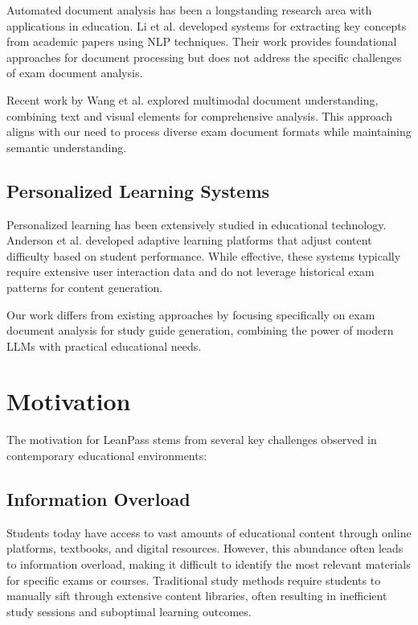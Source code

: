 \documentclass[conference]{IEEEtran}
\begin{document}
Automated document analysis has been a longstanding research area with applications in education. Li et al. \cite{li2021automated} developed systems for extracting key concepts from academic papers using NLP techniques. Their work provides foundational approaches for document processing but does not address the specific challenges of exam document analysis.

Recent work by Wang et al. \cite{wang2023multimodal} explored multimodal document understanding, combining text and visual elements for comprehensive analysis. This approach aligns with our need to process diverse exam document formats while maintaining semantic understanding.

\subsection{Personalized Learning Systems}

Personalized learning has been extensively studied in educational technology. Anderson et al. \cite{anderson2023personalized} developed adaptive learning platforms that adjust content difficulty based on student performance. While effective, these systems typically require extensive user interaction data and do not leverage historical exam patterns for content generation.

Our work differs from existing approaches by focusing specifically on exam document analysis for study guide generation, combining the power of modern LLMs with practical educational needs.

\section{Motivation}

The motivation for LeanPass stems from several key challenges observed in contemporary educational environments:

\subsection{Information Overload}

Students today have access to vast amounts of educational content through online platforms, textbooks, and digital resources. However, this abundance often leads to information overload, making it difficult to identify the most relevant materials for specific exams or courses. Traditional study methods require students to manually sift through extensive content libraries, often resulting in inefficient study sessions and suboptimal learning outcomes.
\end{document}
